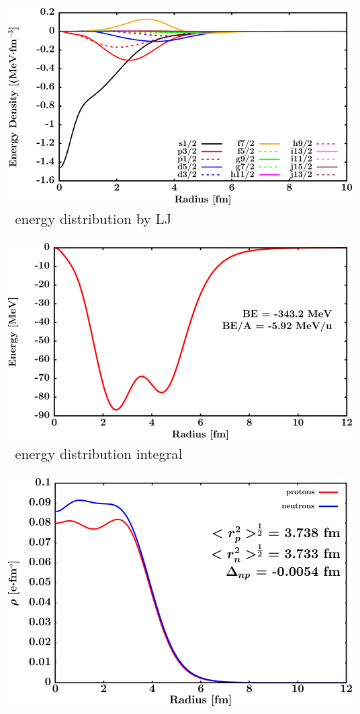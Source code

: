 \begin{figure}[hbtp]
    \begin{subfigure}{0.45\textwidth}
        \centering
        \includegraphics[width=\linewidth]{figures/ni58_EnergyDist.png}
        \caption{\niEight\ energy distribution by LJ}
        \label{DOMFitData_ni58_proton_energyDistInt}
    \end{subfigure}\hspace{6pt}
    \begin{subfigure}{0.45\textwidth}
        \centering
        \includegraphics[width=\linewidth]{figures/ni58_EnergyDistIntegral.png}
        \caption{\niEight\ energy distribution integral}
        \label{DOMFitData_ni58_neutron_energyDistInt}
    \end{subfigure}\vspace{0.4in}
    \begin{subfigure}{0.70\textwidth}
        \centering
        \includegraphics[width=\linewidth]{figures/ni58_matterDensity.png}

\end{subfigure}
\end{figure}
